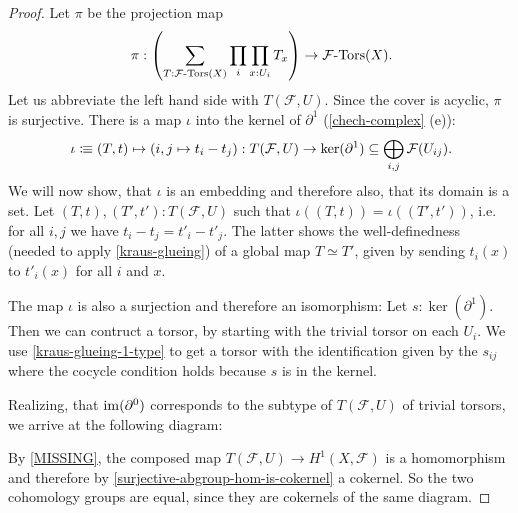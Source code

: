 \begin{proof}
  Let $\pi$ be the projection map
  \[
    \pi :
    \left(
      \sum_{T:\Tors{\mathcal F}(X)}\prod_{i}\prod_{x:U_i}T_x
    \right)
    \to \Tors{\mathcal F}(X)\rlap{.}
  \]
  Let us abbreviate the left hand side with $T(\mathcal F,U)$.
  Since the cover is acyclic, $\pi$ is surjective.
  There is a map $\iota$ into the kernel of $\partial^1$ (\cref{chech-complex} (e)):
  \[
    \iota \colonequiv
    (T,t) \mapsto (i,j\mapsto t_i - t_j) :
    T(\mathcal F,U)
    \to
    \ker(\partial^1)
    \subseteq
    \bigoplus_{i,j}\mathcal F(U_{ij})\rlap{.}
  \]
  We will now show, that $\iota$ is an embedding and therefore also, that its domain is a set.
  Let $(T,t),(T',t'):T(\mathcal F,U)$ such that $\iota((T,t))=\iota((T',t'))$,
  i.e. for all $i,j$ we have $t_i-t_j=t'_i-t'_j$.
  The latter shows the well-definedness (needed to apply \cref{kraus-glueing})
  of a global map $T\simeq T'$, given by sending $t_i(x)$ to $t'_i(x)$
  for all $i$ and $x$.

  The map $\iota$ is also a surjection and therefore an isomorphism:
  Let $s:\ker(\partial^1)$.
  Then we can contruct a torsor,
  by starting with the trivial torsor on each $U_i$.
  We use \cref{kraus-glueing-1-type} to get a torsor
  with the identification given by the $s_{ij}$
  where the cocycle condition holds because $s$ is in the kernel.

  Realizing, that $\operatorname{im}(\partial^0)$ corresponds to the subtype of $T(\mathcal F,U)$ of trivial torsors,
  we arrive at the following diagram:
  \begin{center}
  \end{center}
  By \cref{MISSING},
  the composed map $T(\mathcal F,U)\to H^1(X,\mathcal F)$ is a homomorphism
  and therefore by \cref{surjective-abgroup-hom-is-cokernel} a cokernel.
  So the two cohomology groups are equal, since they are cokernels of the same diagram.
\end{proof}
